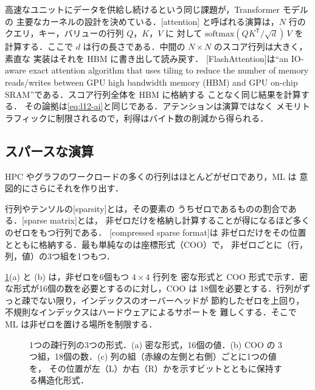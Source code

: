 \documentclass[../main.tex]{subfiles}
\begin{document}
高速なユニットにデータを供給し続けるという同じ課題が，Transformer モデルの
主要なカーネルの設計を決めている．[attention]
と呼ばれる演算は，$N$ 行のクエリ，キー，バリューの行列 $Q$，$K$，$V$ に
対して $\mathrm{softmax}(QK^{\mathsf T}/\sqrt{d})\,V$ を計算する．ここで
$d$ は行の長さである．中間の $N \times N$ のスコア行列は大きく，素直な
実装はそれを HBM に書き出して読み戻す．
[FlashAttention]は\enquote{an IO-aware exact
attention algorithm that uses tiling to reduce the number of memory
reads/writes between GPU high bandwidth memory (HBM) and GPU on-chip
SRAM}\cite{dao2022flashattention}である．スコア行列全体を HBM に格納する
ことなく同じ結果を計算する．
その論拠は\cref{eq:l12-ai}と同じである．アテンションは演算ではなく
メモリトラフィックに制限されるので，利得はバイト数の削減から得られる．

\subsection{スパースな演算}

HPC やグラフのワークロードの多くの行列はほとんどがゼロであり，ML は
意図的にさらにそれを作り出す．

\begin{definition}
  行列やテンソルの[sparsity]とは，その要素の
  うちゼロであるものの割合である．[sparse matrix]とは，
  非ゼロだけを格納し計算することが得になるほど多くのゼロをもつ行列である．
  [compressed sparse format]は
  非ゼロだけをその位置とともに格納する．最も単純なのは座標形式（COO）で，
  非ゼロごとに（行，列，値）の3つ組を1つもつ．
\end{definition}

\cref{fig:l12-sparse}(a) と (b) は，非ゼロを6個もつ $4 \times 4$ 行列を
密な形式と COO 形式で示す．密な形式が16個の数を必要とするのに対し，COO は
18個を必要とする．行列がずっと疎でない限り，インデックスのオーバーヘッドが
節約したゼロを上回り，不規則なインデックスはハードウェアによるサポートを
難しくする．そこで ML は非ゼロを置ける場所を制限する．

\begin{figure}[tb]
  \centering
  
  \caption{1つの疎行列の3つの形式．(a) 密な形式，16個の値．(b) COO の
    3つ組，18個の数．(c) 列の組（赤線の左側と右側）ごとに1つの値を，
    その位置が左（L）か右（R）かを示すビットとともに保持する構造化形式．}
  \label{fig:l12-sparse}
\end{figure}
\end{document}
